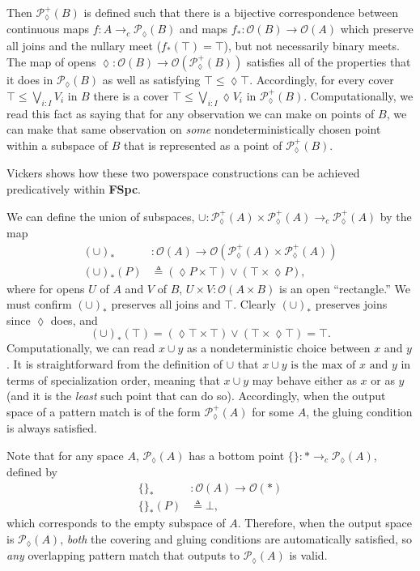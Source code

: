 \documentclass[conference]{IEEEtran}
\newcommand{\PLower}{\mathcal{P}_\lozenge}
\newcommand{\cto}{\to_c}
\newcommand{\One}{\ast}
\newcommand{\Open}[1]{\mathcal{O}({#1})}
\newcommand{\isthemaxof}[3]{{#1}\text{ is the max of }{#2}\text{ and }{#3}}
\begin{document}
Then $\PLower^+(B)$ is defined such that there is a bijective correspondence between continuous maps $f : A \cto \PLower(B)$ and maps $f_* : \Open{B} \to \Open{A}$ which preserve all joins and the nullary meet ($f_*(\top) = \top$), but not necessarily binary meets. The map of opens $\lozenge : \Open{B} \to \Open{\PLower^+(B)}$ satisfies all of the properties that it does in $\PLower(B)$ as well as satisfying
$\top \le \lozenge \top$. Accordingly, for every cover $\top \le \bigvee_{i : I} V_i$ in $B$ there is a cover $\top \le \bigvee_{i : I} \lozenge V_i$ in $\PLower^+(B)$. Computationally, we read this fact as saying that for any observation we can make on points of $B$, we can make that same observation on \emph{some} nondeterministically chosen point within a subspace of $B$ that is represented as a point of $\PLower^+(B)$.

Vickers \cite{vickersdoublepowerlocale} shows how these two powerspace constructions can be achieved predicatively within \textbf{FSpc}. 

We can define the union of subspaces, $
\cup : \PLower^+(A) \times \PLower^+(A) \cto \PLower^+(A)$ by the map
\begin{align*}
(\cup)_* &: \Open{A} \to \Open{\PLower^+(A) \times \PLower^+(A)}
\\ (\cup)_*(P) &\triangleq (\lozenge P \times \top) \vee (\top \times \lozenge P),
\end{align*}
where for opens $U$ of $A$ and $V$ of $B$, $U \times V : \Open{A \times B}$ is an open ``rectangle.''
We must confirm $(\cup)_*$ preserves all joins and $\top$. Clearly $(\cup)_*$ preserves joins since $\lozenge$ does, and
\[
(\cup)_*(\top) = (\lozenge \top \times \top) \vee (\top \times \lozenge \top) = \top.
\]
Computationally, we can read $x \cup y$ as a nondeterministic choice between $x$ and $y$.
It is straightforward from the definition of $\cup$ that $\isthemaxof{x \cup y}{x}{y}$ in terms of specialization order, meaning that $x \cup y$ may behave either as $x$ or as $y$ (and it is the \emph{least} such point that can do so). Accordingly, when the output space of a pattern match is of the form $\PLower^+(A)$ for some $A$, the gluing condition is always satisfied.

Note that for any space $A$, $\PLower(A)$ has a bottom point $\{ \} : \One \cto \PLower(A)$, defined by
\begin{align*}
\{\}_* &: \Open{A} \to \Open{\One}
\\ \{ \}_*(P) &\triangleq \bot,
\end{align*}
which corresponds to the empty subspace of $A$. Therefore, when the output space is $\PLower(A)$, \emph{both} the covering and gluing conditions are automatically satisfied, so \emph{any} overlapping pattern match that outputs to $\PLower(A)$ is valid.
\end{document}
